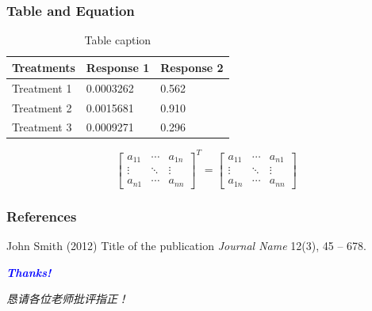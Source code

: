 \documentclass[aspectratio=169]{beamer}
\begin{document}
\begin{frame}
\frametitle{Table and Equation}
\vspace{-0.3cm}
\begin{table}
	\caption{Table caption}
	\begin{tabular}{l l l}
		\toprule
		\textbf{Treatments} & \textbf{Response 1} & \textbf{Response 2}\\
		\midrule
		Treatment 1 & 0.0003262 & 0.562 \\
		Treatment 2 & 0.0015681 & 0.910 \\
		Treatment 3 & 0.0009271 & 0.296 \\
		\bottomrule
	\end{tabular}
\end{table}

\begin{equation} %
\label{eq:matrix_transpose}
\left[
\begin{array}{ccc}
a_{11} & \cdots & a_{1n} \\
\vdots & \ddots & \vdots \\
a_{n1} & \cdots & a_{nn}
\end{array}
\right]^T
=
\left[
\begin{array}{ccc}
a_{11} & \cdots & a_{n1} \\
\vdots & \ddots & \vdots \\
a_{1n} & \cdots & a_{nn}
\end{array}
\right]
\end{equation}
\end{frame}


\begin{frame}
\frametitle{References}
\footnotesize{
\begin{thebibliography}{99} %
 John Smith (2012)
\newblock Title of the publication
\newblock \emph{Journal Name} 12(3), 45 -- 678.
\end{thebibliography}
}
\end{frame}

\begin{frame}
	\centering
	\Huge{\bfseries\itshape\textcolor{blue}{Thanks!}}\par
	\Large\itshape 恳请各位老师批评指正！
\end{frame}
\end{document}
